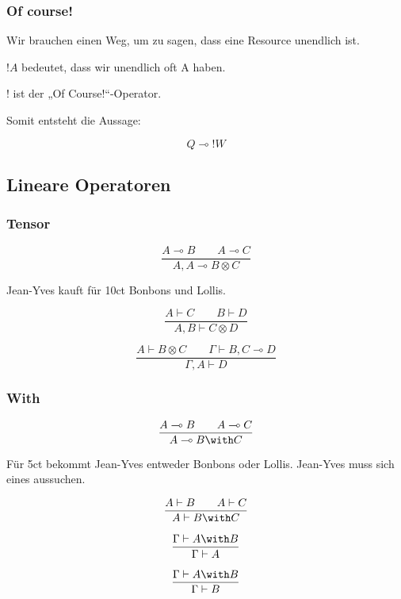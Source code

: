 \documentclass{beamer}
\begin{document}
\begin{frame}
  \frametitle{Of course!}
  Wir brauchen einen Weg, um zu sagen, dass eine Resource unendlich ist. \par
  $!A$ bedeutet, dass wir unendlich oft A haben. \par

  \pause%

  $!$ ist der „Of Course!“-Operator. \par
  
  \pause%

  Somit entsteht die Aussage:
  
  \begin{equation}
    Q \multimap !W
  \end{equation}
\end{frame}

\subsection{Lineare Operatoren}
\begin{frame}
  \frametitle{Tensor}
  \begin{equation}
    \frac{A \multimap B \qquad A \multimap C}
         {A, A \multimap B \otimes C}
  \end{equation}

  Jean-Yves kauft für 10ct Bonbons und Lollis.

  \pause%

  \begin{equation}
    \frac{A \vdash C \qquad B \vdash D}
         {A, B \vdash C \otimes D}
  \end{equation}

  \begin{equation}
    \frac{A \vdash B \otimes C \qquad \Gamma \vdash B, C \multimap D}
         {\Gamma, A \vdash D}
  \end{equation}
\end{frame}

\begin{frame}
  \frametitle{With}
  \begin{equation}
    \frac{A \multimap B \qquad A \multimap C}
         {A \multimap B \with C}
  \end{equation}

  Für 5ct bekommt Jean-Yves entweder Bonbons oder Lollis. Jean-Yves muss sich eines aussuchen.

  \pause%

  \begin{equation}
    \frac{A \vdash B \qquad A \vdash C}
         {A \vdash B \with C}
  \end{equation}

  \begin{equation}
    \frac{\Gamma \vdash A \with B}
         {\Gamma \vdash A}
  \end{equation}

  \begin{equation}
    \frac{\Gamma \vdash A \with B}
         {\Gamma \vdash B}
  \end{equation}
\end{frame}
\end{document}
